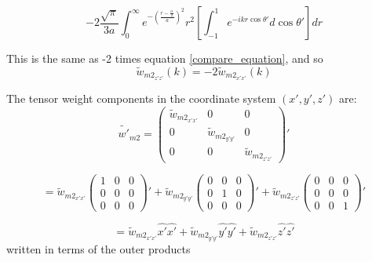 \documentclass[12pt]{article}
\begin{document}
\begin{equation}{-2\frac{\sqrt{\pi}}{3a}\int_{0}^{\infty}e^{-\left(\frac{r-\frac{\alpha}{2}}{a}\right)^2}r^2\left[\int_{-1}^{1}e^{-ikr\cos\theta'}d{\cos\theta'}\right]d{r}}\end{equation}
\color{black} 

This is the same as -2 times equation \ref{compare_equation}, and so \begin{equation}{\widetilde{w}_{{m2}_{z'z'}}(k)=-2\widetilde{w}_{{m2}_{x'x'}}(k)}\end{equation}

\noindent The tensor weight components in the coordinate system $(x',y',z')$ are:
\begin{equation}\label{tensorcomp}{\widetilde{w'}_{m2}=\left(\begin{array}{ccc} \widetilde{w}_{{m2}_{x'x'}} & 0 & 0 \\ 0 & \widetilde{w}_{{m2}_{y'y'}} & 0 \\ 0 & 0 & \widetilde{w}_{{m2}_{z'z'}} \end{array}\right)'}\end{equation}

\begin{displaymath}{=\widetilde{w}_{{m2}_{x'x'}}\left(\begin{array}{ccc} 1 & 0 & 0 \\ 0 & 0 & 0 \\ 0 & 0 & 0 \end{array}\right)'+ \widetilde{w}_{{m2}_{y'y'}}\left(\begin{array}{ccc} 0 & 0 & 0 \\ 0 & 1 & 0 \\ 0 & 0 & 0 \end{array}\right)' + \widetilde{w}_{{m2}_{z'z'}}\left(\begin{array}{ccc} 0 & 0 & 0 \\ 0 & 0 & 0 \\ 0 & 0 & 1 \end{array}\right)'}\end{displaymath}

\begin{equation}{=\widetilde{w}_{{m2}_{x'x'}}\hat{x'}\hat{x'}+\widetilde{w}_{{m2}_{y'y'}}\hat{y'}\hat{y'}+\widetilde{w}_{{m2}_{z'z'}}\hat{z'}\hat{z'}}\end{equation}
written in terms of the outer products
\end{document}
